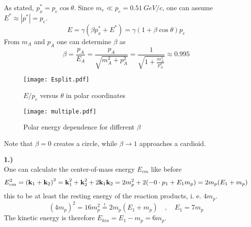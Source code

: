 \documentclass[a4paper, 11pt]{scrartcl}
\let\blattno1
\newcounter{taski}
\newcommand{\task}{\stepcounter{taski}\textbf{\blattno.\arabic{taski})}\\}
\let\vec\textbf
\begin{document}
As stated, $p_x^* = p_e\cos\theta$. Since $m_e \ll p_e = 0.51\:\si{GeV}/c$, one can assume $E^* \approx |p^*| = p_e$.
\[ E = \gamma(\beta p_x^* + E^*) = \gamma(1+\beta\cos\theta)p_e \]
From $m_A$ and $p_A$ one can determine $\beta$ as
\[ \beta = \frac{p_A}{E_A} = \frac{p_A}{\sqrt{m_A^2+p_A^2}} = \frac1{\sqrt{1+\frac{m_A^2}{p_A^2}}} \approx 0.995 \]
\begin{figure}[H]
    \centering
    \texttt{[image: Esplit.pdf]}
    \caption{$E/p_e$ versus $\theta$ in polar coordinates}
\end{figure}
\begin{figure}[H]
    \centering
    \texttt{[image: multiple.pdf]}
    \caption{Polar energy dependence for different $\beta$}
\end{figure}
Note that $\beta = 0$ creates a circle, while $\beta \rightarrow 1$ approaches a cardioid.

\task One can calculate the center-of-mass energy $E_{cm}$ like before
\[
    E_{cm}^2 = \qty(\vec{k}_1 + \vec{k}_2)^2
    = \vec{k}_1^2 + \vec{k}_2^2 + 2\vec{k}_1\vec{k}_2
    = 2m_p^2 + 2\qty(-0\cdot p_1 + E_1m_p)
    = 2m_p(E_1+m_p)
\]
this to be at least the resting energy of the reaction products, i. e. $4m_p$.
\[ (4m_p)^2 = 16m_p^2 \stackrel!= 2m_p(E_1+m_p) \quad,\quad
   E_1 = 7m_p
\]
The kinetic energy is therefore $E_{kin} = E_1 - m_p = 6m_p$.
\end{document}
